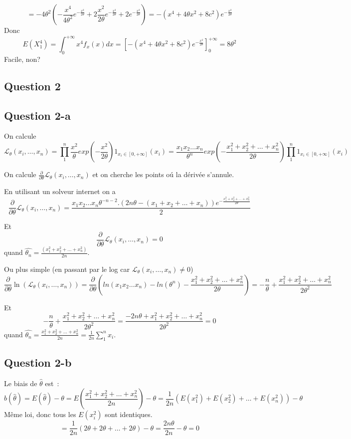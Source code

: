 \documentclass[]{book}
\theoremstyle{definition}
\begin{document}
$$
= -4\theta^2 \left(-\frac{x^4}{4\theta^2} e^{-\frac{x^2}{2\theta}} + 2 \frac{x^2}{2\theta} e^{-\frac{x^2}{2\theta}} + 2 e^{-\frac{x^2}{2\theta}} \right) = -(x^4 + 4\theta x^2 +8c^2) e^{-\frac{x^2}{2\theta}}
$$
Donc 
$$
E(X_1^4) = \int_{0}^{+\infty} x^4 f_{x}(x) dx = \left[ -(x^4 + 4\theta x^2 +8c^2) e^{-\frac{x^2}{2\theta}} \right]_{0}^{+\infty} = 8\theta^2
$$
Facile, non?



\subsection*{Question 2}
\subsection*{Question 2-a}
On calcule
$$
\mathcal{L}_{\theta}(x_i,\ldots,x_n) = 
\prod_{1}^{n}\frac{x^2}{\theta} exp \left( -\frac{x^2}{2\theta}\right) 1_{x_i \in [0,+\infty]}(x_i) =
\frac{x_1x_2 \ldots x_n}{\theta^n} exp \left( -\frac{x_1^2+x_2^2+ \ldots +x_n^2 }{2\theta} \right) \prod_{1}^{n}{1_{x_i \in [0,+\infty]}(x_i)}
$$

On calcule $\frac{\partial}{\partial \theta} \mathcal{L}_{\theta}(x_i,\ldots,x_n)$ et on cherche  les points o\'u la d\'eriv\'ee s'annule. 

En utilisant un solveur internet on a 
$$
\frac{\partial}{\partial \theta} \mathcal{L}_{\theta}(x_i,\ldots,x_n) = \frac{x_1 x_2 \ldots x_n \theta^{-n-2}.(2n\theta - (x_1+x_2+\ldots + x_n)) e^{-\frac{x_1^2+x_2^2+ \ldots + x_n^2}{2\theta}}} {2}
$$

Et
$$
\frac{\partial}{\partial \theta} \mathcal{L}_{\theta}(x_i,\ldots,x_n) = 0
$$
quand $\hat{\theta_n} = \frac{(x_1^2+x_2^2+\ldots + x_n^2)}{2n}$.

Ou plus simple (en passant par le log car $\mathcal{L}_{\theta}(x_i,\ldots,x_n) \neq 0$)
$$
\frac{\partial}{\partial \theta} \ln(\mathcal{L}_{\theta}(x_i,\ldots,x_n)) = \frac{\partial}{\partial \theta} \left( ln(x_1x_2 \ldots x_n) - ln(\theta^n)  -  \frac{x_1^2+x_2^2+ \ldots + x_n^2}{2\theta} \right) = -\frac{n}{\theta} + \frac{x_1^2+x_2^2+ \ldots + x_n^2}{2\theta^2}
$$

Et
$$
-\frac{n}{\theta}+\frac{x_1^2+x_2^2+ \ldots + x_n^2}{2\theta^2} = \frac{-2n\theta + x_1^2+x_2^2+ \ldots + x_n^2}{2\theta^2} = 0
$$
quand $\hat{\theta_n} = \frac{x_1^2+x_2^2+\ldots + x_n^2}{2n} = \frac{1}{2n} \sum_{1}^{n}{x_i}$.

\subsection*{Question 2-b}
Le biais de $\hat{\theta}$ est~:
$$
b(\hat{\theta}) = E(\hat{\theta}) - \theta = E\left(\frac{x_1^2+x_2^2+\ldots + x_n^2}{2n}\right) - \theta = \frac{1}{2n}(E(x_1^2) + E(x_2^2) + \ldots + E(x_n^2)) - \theta
$$
M\^eme loi, donc tous les $E(x_i^2)$ sont identiques. 
$$
=\frac{1}{2n}(2\theta + 2\theta + \ldots + 2\theta) - \theta = \frac{2n\theta}{2n} - \theta = 0
$$
\end{document}
